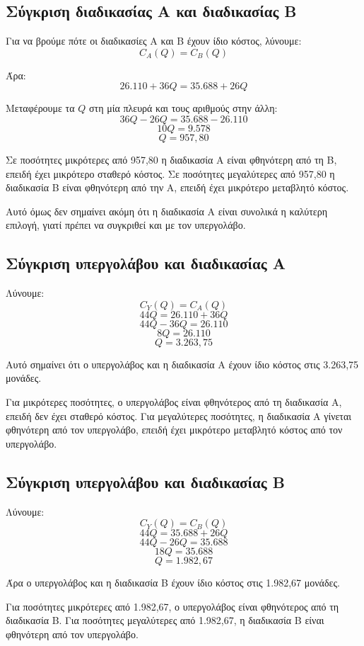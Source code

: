 \documentclass[12pt,a4paper]{article}
\begin{document}
\subsection{Σύγκριση διαδικασίας Α και διαδικασίας Β}

Για να βρούμε πότε οι διαδικασίες Α και Β έχουν ίδιο κόστος, λύνουμε:
\[
C_A(Q)=C_B(Q)
\]

Άρα:
\[
26.110+36Q=35.688+26Q
\]

Μεταφέρουμε τα \(Q\) στη μία πλευρά και τους αριθμούς στην άλλη:
\[
36Q-26Q=35.688-26.110
\]
\[
10Q=9.578
\]
\[
Q=957{,}80
\]

Σε ποσότητες μικρότερες από 957,80 η διαδικασία Α είναι φθηνότερη από τη Β, επειδή έχει μικρότερο σταθερό κόστος. Σε ποσότητες μεγαλύτερες από 957,80 η διαδικασία Β είναι φθηνότερη από την Α, επειδή έχει μικρότερο μεταβλητό κόστος.

Αυτό όμως δεν σημαίνει ακόμη ότι η διαδικασία Α είναι συνολικά η καλύτερη επιλογή, γιατί πρέπει να συγκριθεί και με τον υπεργολάβο.

\subsection{Σύγκριση υπεργολάβου και διαδικασίας Α}

Λύνουμε:
\[
C_Y(Q)=C_A(Q)
\]
\[
44Q=26.110+36Q
\]
\[
44Q-36Q=26.110
\]
\[
8Q=26.110
\]
\[
Q=3.263{,}75
\]

Αυτό σημαίνει ότι ο υπεργολάβος και η διαδικασία Α έχουν ίδιο κόστος στις 3.263,75 μονάδες.

Για μικρότερες ποσότητες, ο υπεργολάβος είναι φθηνότερος από τη διαδικασία Α, επειδή δεν έχει σταθερό κόστος. Για μεγαλύτερες ποσότητες, η διαδικασία Α γίνεται φθηνότερη από τον υπεργολάβο, επειδή έχει μικρότερο μεταβλητό κόστος από τον υπεργολάβο.

\subsection{Σύγκριση υπεργολάβου και διαδικασίας Β}

Λύνουμε:
\[
C_Y(Q)=C_B(Q)
\]
\[
44Q=35.688+26Q
\]
\[
44Q-26Q=35.688
\]
\[
18Q=35.688
\]
\[
Q=1.982{,}67
\]

Άρα ο υπεργολάβος και η διαδικασία Β έχουν ίδιο κόστος στις 1.982,67 μονάδες.

Για ποσότητες μικρότερες από 1.982,67, ο υπεργολάβος είναι φθηνότερος από τη διαδικασία Β. Για ποσότητες μεγαλύτερες από 1.982,67, η διαδικασία Β είναι φθηνότερη από τον υπεργολάβο.
\end{document}
